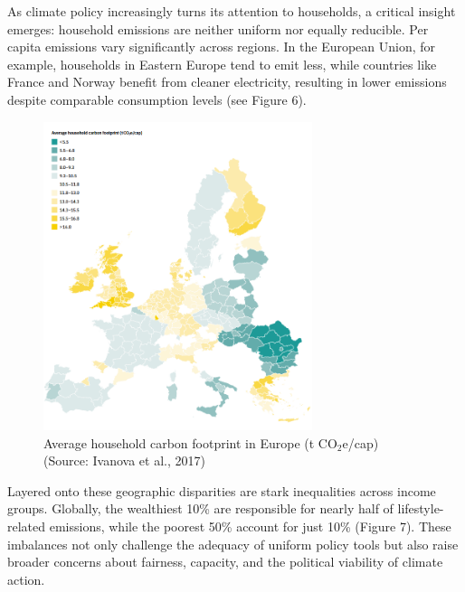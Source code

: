 \documentclass[12pt,a4paper]{article}%
\begin{document}
As climate policy increasingly turns its attention to households, a critical insight emerges: household emissions are neither uniform nor equally reducible. Per capita emissions vary significantly across regions. In the European Union, for example, households in Eastern Europe tend to emit less, while countries like France and Norway benefit from cleaner electricity, resulting in lower emissions despite comparable consumption levels (see Figure 6).
\begin{figure}[h]
    \centering
    \includegraphics[width=0.7\textwidth]{per capita world emissions.png}
    \caption{\small{Average household carbon footprint in Europe (t CO$_2$e/cap) (Source: Ivanova et al., 2017)}}\label{fig:percapita}
\end{figure}

Layered onto these geographic disparities are stark inequalities across income groups. Globally, the wealthiest 10\% are responsible for nearly half of lifestyle-related emissions, while the poorest 50\% account for just 10\% (Figure 7). These imbalances not only challenge the adequacy of uniform policy tools but also raise broader concerns about fairness, capacity, and the political viability of climate action.
\end{document}
